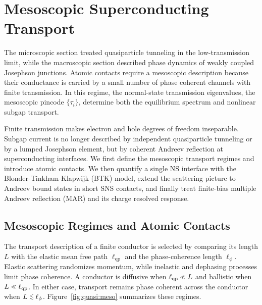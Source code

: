 \section{Mesoscopic Superconducting Transport}
\label{sec:meso}

    The microscopic section treated quasiparticle tunneling in the low-transmission limit, while the macroscopic section described phase dynamics of weakly coupled Josephson junctions. Atomic contacts require a mesoscopic description because their conductance is carried by a small number of phase coherent channels with finite transmission. In this regime, the normal-state transmission eigenvalues, the mesoscopic pincode $\{\tau_i\}$, determine both the equilibrium spectrum and nonlinear subgap transport.

    Finite transmission makes electron and hole degrees of freedom inseparable. Subgap current is no longer described by independent quasiparticle tunneling or by a lumped Josephson element, but by coherent Andreev reflection at superconducting interfaces. We first define the mesoscopic transport regimes and introduce atomic contacts. We then quantify a single NS interface with the Blonder-Tinkham-Klapwijk (BTK) model, extend the scattering picture to Andreev bound states in short SNS contacts, and finally treat finite-bias multiple Andreev reflection (MAR) and its charge resolved response.


    \subsection{Mesoscopic Regimes and Atomic Contacts}
    \label{subsec:quasi:meso}

        The transport description of a finite conductor is selected by comparing its length $L$ with the elastic mean free path $\ell_\mathrm{qp}$ and the phase-coherence length $\ell_\phi$. Elastic scattering randomizes momentum, while inelastic and dephasing processes limit phase coherence. A conductor is diffusive when $\ell_\mathrm{qp}\sll L$ and ballistic when $L\sll\ell_\mathrm{qp}$. In either case, transport remains phase coherent across the conductor when $L\slesssim\ell_\phi$. Figure~\ref{fig:quasi:meso} summarizes these regimes. \cite{gross_festkorperphysik_2014,beenakker_random-matrix_1997}

